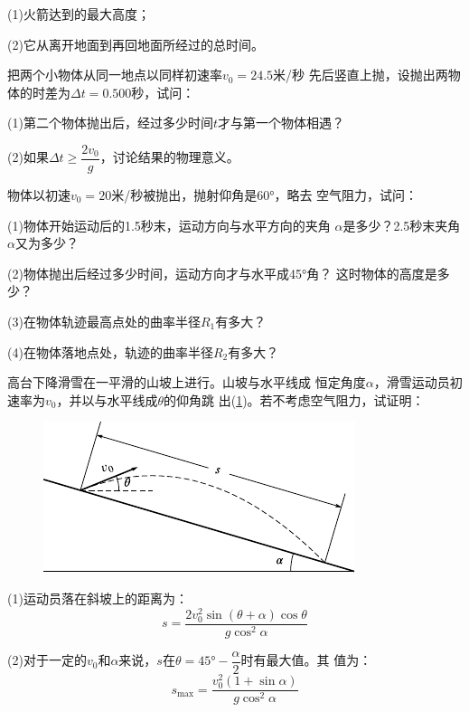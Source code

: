 \begin{exercises}
(1)火箭达到的最大高度；

(2)它从离开地面到再回地面所经过的总时间。

\exercise 把两个小物体从同一地点以同样初速率$v_0=24.5$米/秒
先后竖直上抛，设抛出两物体的时差为$\Delta t=0.500$秒，试问：

(1)第二个物体抛出后，经过多少时间$t$才与第一个物体相遇？

\vspace{-0.15em}(2)如果$\Delta t\geqslant\dfrac{2v_0}{g}$，讨论结果的物理意义。\vspace{-0.15em}

\exercise 物体以初速$v_0=20$米/秒被抛出，抛射仰角是\ang{60;;}，略去
空气阻力，试问：

(1)物体开始运动后的1.5秒末，运动方向与水平方向的夹角
$\alpha$是多少？2.5秒末夹角$\alpha$又为多少？

(2)物体抛出后经过多少时间，运动方向才与水平成\ang{45;;}角？
这时物体的高度是多少？

(3)在物体轨迹最高点处的曲率半径$R_1$有多大？

(4)在物体落地点处，轨迹的曲率半径$R_2$有多大？

\exercise 高台下降滑雪在一平滑的山坡上进行。山坡与水平线成
恒定角度$\alpha$，滑雪运动员初速率为$v_0$，并以与水平线成$\theta$的仰角跳
出(\ref{fig:01.30})。若不考虑空气阻力，试证明：
\begin{figure}[h]
  \centering
  \includegraphics{figure/fig01.30}
  \caption{}
  \label{fig:01.30}
\end{figure}

(1)运动员落在斜坡上的距离为：
\begin{equation*}
  s=\frac{2 v_{0}^{2} \sin \left(\theta+\alpha\right) \cos \theta}{g \cos ^{2} \alpha}
\end{equation*}

(2)对于一定的$v_0$和$\alpha$来说，$s$在$\theta=\ang{45;;}-\dfrac{\alpha}{2}$时有最大值。其
值为：
\begin{equation*}
  s_{\max }=\frac{v_{0}^{2}\left(1+\sin \alpha\right)}{g \cos ^{2} \alpha}
\end{equation*}


\end{exercises}

